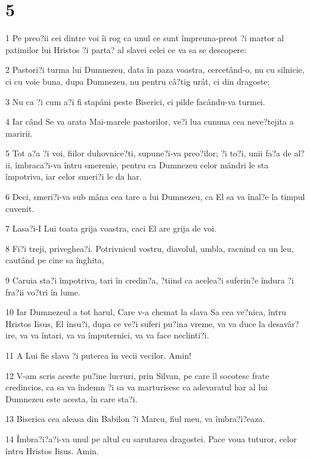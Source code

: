\chapter{5}

\par 1 Pe preo?ii cei dintre voi îi rog ca unul ce sunt împreuna-preot ?i martor al patimilor lui Hristos ?i parta? al slavei celei ce va sa se descopere:
\par 2 Pastori?i turma lui Dumnezeu, data în paza voastra, cercetând-o, nu cu silnicie, ci cu voie buna, dupa Dumnezeu, nu pentru câ?tig urât, ci din dragoste;
\par 3 Nu ca ?i cum a?i fi stapâni peste Biserici, ci pilde facându-va turmei.
\par 4 Iar când Se va arata Mai-marele pastorilor, ve?i lua cununa cea neve?tejita a maririi.
\par 5 Tot a?a ?i voi, fiilor duhovnice?ti, supune?i-va preo?ilor; ?i to?i, unii fa?a de al?ii, îmbraca?i-va întru smerenie, pentru ca Dumnezeu celor mândri le sta împotriva, iar celor smeri?i le da har.
\par 6 Deci, smeri?i-va sub mâna cea tare a lui Dumnezeu, ca El sa va înal?e la timpul cuvenit.
\par 7 Lasa?i-I Lui toata grija voastra, caci El are grija de voi.
\par 8 Fi?i treji, priveghea?i. Potrivnicul vostru, diavolul, umbla, racnind ca un leu, cautând pe cine sa înghita,
\par 9 Caruia sta?i împotriva, tari în credin?a, ?tiind ca acelea?i suferin?e îndura ?i fra?ii vo?tri în lume.
\par 10 Iar Dumnezeul a tot harul, Care v-a chemat la slava Sa cea ve?nica, întru Hristos Iisus, El însu?i, dupa ce ve?i suferi pu?ina vreme, va va duce la desavâr?ire, va va întari, va va împuternici, va va face neclinti?i.
\par 11 A Lui fie slava ?i puterea în vecii vecilor. Amin!
\par 12 V-am scris aceste pu?ine lucruri, prin Silvan, pe care îl socotesc frate credincios, ca sa va îndemn ?i sa va marturisesc ca adevaratul har al lui Dumnezeu este acesta, în care sta?i.
\par 13 Biserica cea aleasa din Babilon ?i Marcu, fiul meu, va îmbra?i?eaza.
\par 14 Îmbra?i?a?i-va unul pe altul cu sarutarea dragostei. Pace voua tuturor, celor întru Hristos Iisus. Amin.


